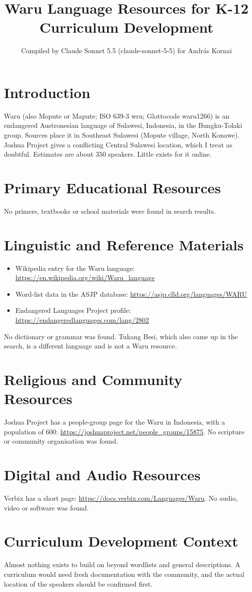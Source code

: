 \documentclass[12pt]{article}
\title{Waru Language Resources for K-12 Curriculum Development}
\author{Compiled by Claude Sonnet 5.5 (claude-sonnet-5-5) for Andr\'as Kornai}
\date{}
\begin{document}
\maketitle

\section{Introduction}
Waru (also Mopute or Mapute; ISO 639-3 wru; Glottocode waru1266) is an endangered Austronesian language of Sulawesi, Indonesia, in the Bungku-Tolaki group. Sources place it in Southeast Sulawesi (Mopute village, North Konawe). Joshua Project gives a conflicting Central Sulawesi location, which I treat as doubtful. Estimates are about 350 speakers. Little exists for it online.

\section{Primary Educational Resources}
No primers, textbooks or school materials were found in search results.

\section{Linguistic and Reference Materials}
\begin{itemize}
\item Wikipedia entry for the Waru language: \url{https://en.wikipedia.org/wiki/Waru_language}
\item Word-list data in the ASJP database: \url{https://asjp.clld.org/languages/WARU}
\item Endangered Languages Project profile: \url{https://endangeredlanguages.com/lang/2802}
\end{itemize}
No dictionary or grammar was found. Tukang Besi, which also came up in the search, is a different language and is not a Waru resource.

\section{Religious and Community Resources}
Joshua Project has a people-group page for the Waru in Indonesia, with a population of 600: \url{https://joshuaproject.net/people_groups/15875}. No scripture or community organisation was found.

\section{Digital and Audio Resources}
Verbix has a short page: \url{https://docs.verbix.com/Languages/Waru}. No audio, video or software was found.

\section{Curriculum Development Context}
Almost nothing exists to build on beyond wordlists and general descriptions. A curriculum would need fresh documentation with the community, and the actual location of the speakers should be confirmed first.
\end{document}
